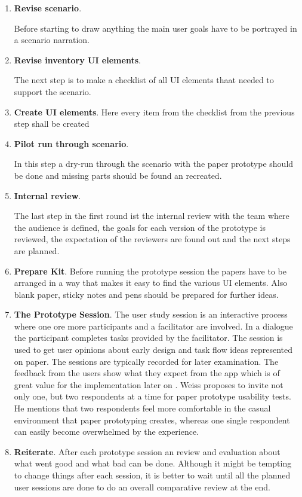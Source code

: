 \begin{enumerate}
	\item \textbf{Revise scenario}.
	
	Before starting to draw anything the main user goals have to be portrayed in a scenario narration.
	\item \textbf{Revise inventory UI elements}.
	
	The next step is to make a checklist of all UI elements thaat needed to support the scenario.
	\item \textbf{Create UI elements}. Here every item from the checklist from the previous step shall be created
	\item \textbf{Pilot run through scenario}.
	
	In this step a dry-run through the scenario with the paper prototype should be done and missing parts should be found an recreated.
	\item \textbf{Internal review}. 
	
	The last step in the first round ist the internal review with the team where the audience is defined, the goals for each version of the prototype is reviewed, the expectation of the reviewers are found out and the next steps are planned.
	\item \textbf{Prepare Kit}. Before running the prototype session the papers have to be arranged in a way that makes it easy to find the various UI elements. Also blank paper, sticky notes and pens should be prepared for further ideas.
	\item \textbf{The Prototype Session}. The user study session is an interactive process where one ore more participants and a facilitator are involved. In a dialogue the participant completes tasks provided by the facilitator. The session is used to get user opinions about early design and task flow ideas represented on paper. The sessions are typically recorded for later examination. The feedback from the users show what they expect from the app which is of great value for the implementation later on \cite{snyder2003paper}. Weiss  \cite[p.~144]{weiss2003handheld} proposes to invite not only one, but two respondents at a time for paper prototype usability tests. He mentions that two respondents feel more comfortable in the casual environment that paper prototyping creates, whereas one single respondent can easily become overwhelmed by the experience.
	\item \textbf{Reiterate}. After each prototype session an review and evaluation about what went good and what bad can be done. Although it might be tempting to change things after each session, it is better to wait until all the planned user sessions are done to do an overall comparative review at the end.
\end{enumerate}






